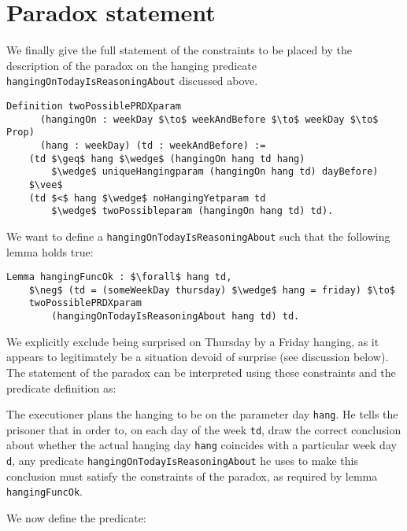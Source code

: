 \documentclass[runningheads]{llncs}
\newenvironment{myindent}{\begin{adjustwidth}{1cm}{}}{\end{adjustwidth}}
\begin{document}
\section{Paradox statement}
\label{sec:constraints}

We finally give the full statement of the constraints to be placed by the description of the paradox on the
hanging predicate {\tt hangingOnTodayIsReasoningAbout} discussed above.

\begin{lstlisting}[mathescape=true]
  Definition twoPossiblePRDXparam
      (hangingOn : weekDay $\to$ weekAndBefore $\to$ weekDay $\to$ Prop)
      (hang : weekDay) (td : weekAndBefore) :=
    (td $\geq$ hang $\wedge$ (hangingOn hang td hang)
        $\wedge$ uniqueHangingparam (hangingOn hang td) dayBefore)
    $\vee$
    (td $<$ hang $\wedge$ noHangingYetparam td
        $\wedge$ twoPossibleparam (hangingOn hang td) td).
\end{lstlisting}

We want to define a {\tt hangingOnTodayIsReasoningAbout} such that
the following lemma holds true:

\begin{lstlisting}[mathescape=true]
Lemma hangingFuncOk : $\forall$ hang td,
    $\neg$ (td = (someWeekDay thursday) $\wedge$ hang = friday) $\to$
    twoPossiblePRDXparam
        (hangingOnTodayIsReasoningAbout hang td) td.
\end{lstlisting}

We explicitly exclude being surprised
on Thursday by a Friday hanging, as it appears to legitimately be a situation devoid
of surprise (see discussion below).
The statement of the paradox can be interpreted using these constraints and
the predicate definition as: \newline

\begin{myindent}
  The executioner plans the hanging to be on the parameter
  day {\tt hang}. He tells the prisoner that in order to, on each day of the week {\tt td},
  draw the correct conclusion about whether the actual hanging day {\tt hang} coincides with a
  particular week day {\tt d}, any predicate {\tt hangingOnTodayIsReasoningAbout}
  he uses to make this conclusion
  must satisfy the constraints of the paradox, as required by lemma {\tt hangingFuncOk}. \newline
\end{myindent}

 We now define the predicate:
\end{document}
